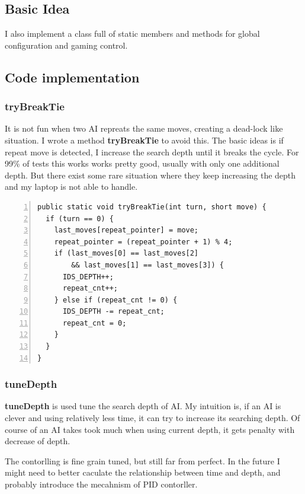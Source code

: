 \documentclass{article}
\begin{document}
\subsection{Basic Idea}
I also implement a class full of static members and methods for global configuration and gaming control.


\subsection{Code implementation}

\subsubsection{tryBreakTie}

It is not fun when two AI repreats the same moves, creating a dead-lock like situation. I wrote a method \textbf{tryBreakTie} to avoid this. The basic ideas is if repeat move is detected, I increase the search depth until it breaks the cycle. For 99\% of tests this works works pretty good, usually with only one additional depth. But there exist some rare situation where they keep increasing the depth and my laptop is not able to handle.

\begin{lstlisting}[numbers=left]
public static void tryBreakTie(int turn, short move) {
  if (turn == 0) {
    last_moves[repeat_pointer] = move;
    repeat_pointer = (repeat_pointer + 1) % 4;
    if (last_moves[0] == last_moves[2]
        && last_moves[1] == last_moves[3]) {
      IDS_DEPTH++;
      repeat_cnt++;
    } else if (repeat_cnt != 0) {
      IDS_DEPTH -= repeat_cnt;
      repeat_cnt = 0;
    }
  }
}
\end{lstlisting}



\subsubsection{tuneDepth}
\textbf{tuneDepth} is used tune the search depth of AI. My intuition is, if an AI is clever and using relatively less time, it can try to increase its searching depth. Of course of an AI takes took much when using current depth, it gets penalty with decrease of depth.

The contorlling is fine grain tuned, but still far from perfect. In the future I might need to better caculate the relationship between time and depth, and probably introduce the mecahnism of PID contorller.
\end{document}
